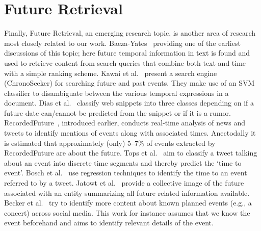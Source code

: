 \section{Future Retrieval}
\vspace{-.8em}
Finally, Future Retrieval, an emerging research topic, is another area of research most closely related to our work.
Baeza-Yates~\cite{baeza2005searching} providing one of the earliest discussions
of this topic; here future temporal information in text is found and used to retrieve content from search queries that 
combine both text and time with a simple ranking scheme. Kawai et al.~\cite{Kawai:2010:CSE} present a search engine (ChronoSeeker) for searching 
future and past events.
They make use of an SVM classifier to disambiguate between the various temporal expressions in a document.
Dias et al.~\cite{dias2011future} classify web snippets into three classes depending on if a future date can/cannot be predicted 
from the snippet or if it is a rumor.
RecordedFuture~\cite{recordedFuture}, introduced earlier, conducts
real-time analysis of news and tweets to identify mentions of events along with associated times. Anectodally it 
is estimated that approximately (only) 5--7\% of events extracted 
by RecordedFuture are about the future.
Tops et al.~\cite{tops2013predicting} aim to classify a tweet talking about an event into discrete time segments and thereby predict the 
`time to event'.
Bosch et al.~\cite{bosch2013estm} use regression techniques to identify the time to an event referred to by a tweet.
Jatowt et al.~\cite{Jatowt:2011:ECE} provide a collective image of the future associated with an entity summarizing all future related information available.
Becker et al.~\cite{Becker:2012:ICP} try to identify more content about known planned events (e.g., a concert) across social media. This work
for instance assumes that we know the event beforehand and aims to identify relevant details of the event.

